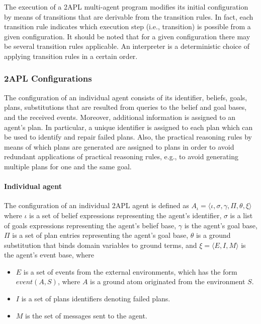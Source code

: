 \documentclass[a4paper]{article}
\begin{document}
The execution of a 2APL multi-agent program modifies its initial configuration by means of transitions that are derivable from the transition rules. In fact, each transition rule indicates which execution step (i.e., transition) is possible from a given configuration. It should be noted that for a given configuration there may be several transition rules applicable. An interpreter is a deterministic choice of applying transition rules in a certain order.

\subsubsection{2APL Configurations}

The configuration of an individual agent consists of its identifier, beliefs, goals, plans, substitutions that are resulted from queries to the belief and goal bases, and the received events. Moreover, additional information is assigned to an agent's plan. In particular, a unique identifier is assigned to each plan which can be used to identify and repair failed plans. Also, the practical reasoning rules by means of which plans are generated are assigned to plans in order to avoid redundant applications of practical reasoning rules, e.g., to avoid generating multiple plans for one and the same goal.

\paragraph{Individual agent}

The configuration of an individual 2APL agent is defined as $ A_{\iota} = \langle \iota, \sigma, \gamma, \Pi, \theta, \xi \rangle $ where $\iota$ is a set of belief expressions representing the agent's identifier, $\sigma$ is a list of goals expressions representing the agent's belief base, $\gamma$ is the agent's goal base,  $\Pi$ is a set of plan entries representing the agent's goal base, $\theta$ is a ground substitution that binds domain variables to ground terms, and $\xi = \langle E, I, M \rangle$ is the agent's event base, where

\begin{itemize}
 \item $E$ is a set of events from the external environments, which has the form $event(A,S)$, where $A$ is a ground atom originated from the environment $S$.
 \item $I$ is a set of plans identifiers denoting failed plans.
 \item $M$ is the set of messages sent to the agent.
\end{itemize}
\end{document}
